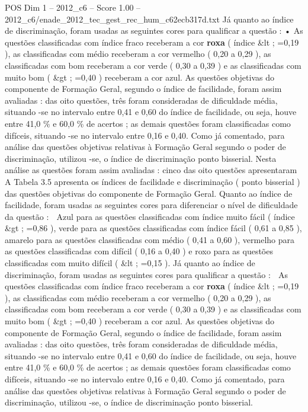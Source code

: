 \begin{textsample}{POS Dim 1 – 2012\_c6 – Score 1.00 – 2012\_c6/enade\_2012\_tec\_gest\_rec\_hum\_c62ecb317d.txt}
Já quanto ao índice de discriminação, foram usadas as seguintes cores para qualificar a questão : • As questões classificadas com índice fraco receberam a cor \textbf{roxa} ( índice \&lt ; =0,19 ), as classificadas com médio receberam a cor vermelho ( 0,20 a 0,29 ), as classificadas com bom receberam a cor verde ( 0,30 a 0,39 ) e as classificadas com muito bom ( \&gt ; =0,40 ) receberam a cor azul.
As questões objetivas do componente de Formação Geral, segundo o índice de facilidade, foram assim avaliadas : das oito questões, três foram consideradas de dificuldade média, situando -se no intervalo entre 0,41 e 0,60 do índice de facilidade, ou seja, houve entre 41,0 \% e 60,0 \% de acertos ; as demais questões foram classificadas como difíceis, situando -se no intervalo entre 0,16 e 0,40.
Como já comentado, para análise das questões objetivas relativas à Formação Geral segundo o poder de discriminação, utilizou -se, o índice de discriminação ponto bisserial.
Nesta análise as questões foram assim avaliadas : cinco das oito questões apresentaram A Tabela 3.5 apresenta os índices de facilidade e discriminação ( ponto bisserial ) das questões objetivas do componente de Formação Geral.
Quanto ao índice de facilidade, foram usadas as seguintes cores para diferenciar o nível de dificuldade da questão :  Azul para as questões classificadas com índice muito fácil ( índice \&gt ; =0,86 ), verde para as questões classificadas com índice fácil ( 0,61 a 0,85 ), amarelo para as questões classificadas com médio ( 0,41 a 0,60 ), vermelho para as questões classificadas com difícil ( 0,16 a 0,40 ) e roxo para as questões classificadas com muito difícil ( \&lt ; =0,15 ).
Já quanto ao índice de discriminação, foram usadas as seguintes cores para qualificar a questão :  As questões classificadas com índice fraco receberam a cor \textbf{roxa} ( índice \&lt ; =0,19 ), as classificadas com médio receberam a cor vermelho ( 0,20 a 0,29 ), as classificadas com bom receberam a cor verde ( 0,30 a 0,39 ) e as classificadas com muito bom ( \&gt ; =0,40 ) receberam a cor azul.
As questões objetivas do componente de Formação Geral, segundo o índice de facilidade, foram assim avaliadas : das oito questões, três foram consideradas de dificuldade média, situando -se no intervalo entre 0,41 e 0,60 do índice de facilidade, ou seja, houve entre 41,0 \% e 60,0 \% de acertos ; as demais questões foram classificadas como difíceis, situando -se no intervalo entre 0,16 e 0,40.
Como já comentado, para análise das questões objetivas relativas à Formação Geral segundo o poder de discriminação, utilizou -se, o índice de discriminação ponto bisserial.

\end{textsample}
